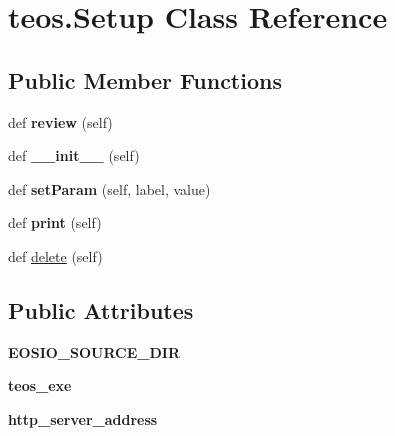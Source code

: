 \hypertarget{classteos_1_1Setup}{}\section{teos.\+Setup Class Reference}
\label{classteos_1_1Setup}
\subsection*{Public Member Functions}
\begin{DoxyCompactItemize}
\item 
\mbox{\label{classteos_1_1Setup_aff8b9040b021a678da4e6a782bbdf77e}} 
def {\bfseries review} (self)
\item 
\mbox{\label{classteos_1_1Setup_aa232f8cadab924bfa50e386a21c34405}} 
def {\bfseries \+\_\+\+\_\+init\+\_\+\+\_\+} (self)
\item 
\mbox{\label{classteos_1_1Setup_a3b6396734cb69d8741cd33ba9db84976}} 
def {\bfseries set\+Param} (self, label, value)
\item 
\mbox{\label{classteos_1_1Setup_a8b3e809cbf04cf9a466dd2222b78a326}} 
def {\bfseries print} (self)
\item 
def \mbox{\hyperlink{classteos_1_1Setup_a34c784372e90531c81a21a8a003b6ce8}{delete}} (self)
\end{DoxyCompactItemize}
\subsection*{Public Attributes}
\begin{DoxyCompactItemize}
\item 
\mbox{\label{classteos_1_1Setup_a289286b6244ca5cf7202f6b1ed644cb5}} 
{\bfseries E\+O\+S\+I\+O\+\_\+\+S\+O\+U\+R\+C\+E\+\_\+\+D\+IR}
\item 
\mbox{\label{classteos_1_1Setup_a4ee27928cfec5e06d5b4214c176efeb3}} 
{\bfseries teos\+\_\+exe}
\item 
\mbox{\label{classteos_1_1Setup_af3fda39811eb0c86e527f059750e880b}} 
{\bfseries http\+\_\+server\+\_\+address}
\end{DoxyCompactItemize}


